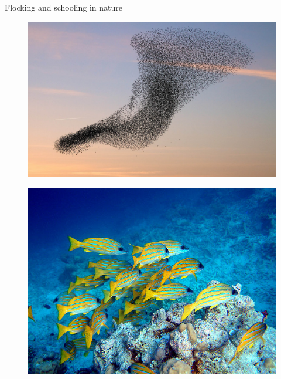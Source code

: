 \begin{frame}{Flocking and schooling in nature}

\begin{minipage}{0.45\textwidth}	
	\begin{figure}
		\includegraphics[width=\textwidth]{figures/flock_of_birds.jpg}
	\end{figure}
\end{minipage}
\hspace{0.05cm}
\begin{minipage}{0.45\textwidth}	
	\begin{figure}
		\includegraphics[width=\textwidth]{figures/schooling_fish.jpg}

\end{figure}
\end{minipage}
\end{frame}
